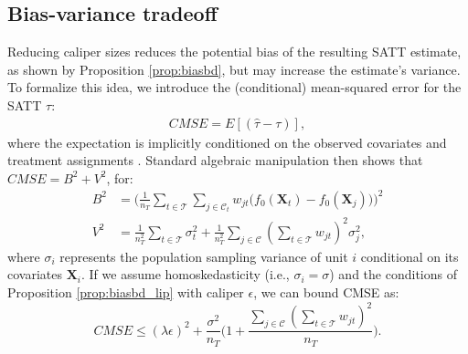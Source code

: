 \documentclass{article}
\newcommand{\bX}{\mathbf{X}}
\newcommand{\Xt}{\mathbf{X}_t}
\newcommand{\Xj}{\mathbf{X}_j}
\newcommand{\Ct}{\mathcal{C}_{t}}
\begin{document}
\subsection{Bias-variance tradeoff}

Reducing caliper sizes reduces the potential bias of the resulting SATT estimate, as shown by Proposition \ref{prop:biasbd}, but may increase the estimate's variance.
To formalize this idea, we introduce the (conditional) mean-squared error for the SATT $\tau$:
\begin{align*}
    CMSE = E[(\hat{\tau} - \tau)],
\end{align*}
where the expectation is implicitly conditioned on the observed covariates and treatment assignments \citep{kallus2020generalized}.
Standard algebraic manipulation then shows that $CMSE = B^2 + V^2$, for:
\begin{align*}
    B^2 &= 
        \Big(\frac{1}{n_T} \sum_{t \in \mathcal{T}} \sum_{j \in \Ct} 
            w_{jt} \big( f_0(\Xt) - f_0(\Xj) \big) \Big)^2 \\
    V^2 &=
        \frac{1}{n_T^2} \sum_{t \in \mathcal{T}} \sigma_t^2 +
        \frac{1}{n_T^2} \sum_{j \in \mathcal{C}} (\sum_{t \in \mathcal{T}} w_{jt})^2 \sigma_j^2,
\end{align*}
where $\sigma_i$ represents the population sampling variance of unit $i$ conditional on its covariates $\bX_i$.
If we assume homoskedasticity (i.e., $\sigma_i = \sigma$) and the conditions of Proposition \ref{prop:biasbd_lip} with caliper $\epsilon$, we can bound CMSE as:
\begin{equation}
\label{eq:cmsebd}
    CMSE \leq 
        (\lambda \epsilon)^2 +
        \frac{\sigma^2}{n_T} \Big(1 + \frac{\sum_{j \in \mathcal{C}} (\sum_{t \in \mathcal{T}} w_{jt})^2}{n_T} \Big).
\end{equation}
\end{document}
